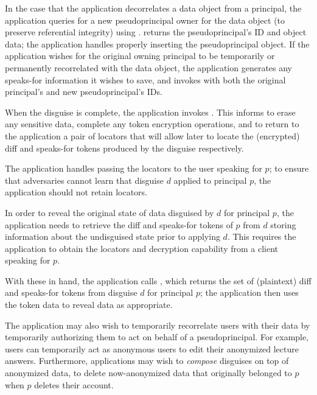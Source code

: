 In the case that the application decorrelates a data object from a principal, the application
queries \sys for a new pseudoprincipal owner for the data object (to preserve referential integrity)
using . \sys returns the pseudoprincipal's ID and object data; the
application handles properly inserting the pseudoprincipal object.  If the application wishes for
the original owning principal to be temporarily or permanently recorrelated with the data object,
the application generates any speaks-for information it wishes to save, and invokes
 with both the original principal's and new pseudoprincipal's IDs.

When the disguise is complete, the application invokes . This informs \sys to erase
any sensitive data, complete any token encryption operations, and to return to the application a
pair of locators that will allow \sys later to locate the (encrypted) diff and speaks-for tokens
produced by the disguise respectively.

The application handles passing the locators  to the user speaking for $p$; to ensure that
adversaries cannot learn that disguise $d$ applied to principal $p$, the application should not
retain locators.

In order to reveal the original state of data disguised by $d$ for principal $p$, the application
needs to retrieve the diff and speaks-for tokens of $p$ from $d$ storing information about the undisguised
state prior to applying $d$.
This requires the application to obtain the locators  and decryption capability 
from a client speaking for $p$.

With these in hand, the application calls , which returns the set of
(plaintext) diff and speaks-for tokens from disguise $d$ for principal $p$; the application then uses
the token data to reveal data as appropriate.

The application may also wish to temporarily recorrelate users with their data by temporarily
authorizing them to act on behalf of a pseudoprincipal. For example, users can temporarily act as
anonymous users to edit their anonymized lecture answers. Furthermore, applications may wish to
\emph{compose} disguises on top of anonymized data, to \eg delete now-anonymized data that
originally belonged to $p$ when $p$ deletes their account.

